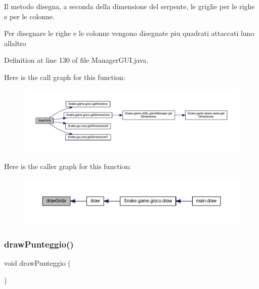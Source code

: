 Il metodo disegna, a seconda della dimensione del serpente, le griglie per le righe e per le colonne. 

Per disegnare le righe e le colonne vengono disegnate piu\textquotesingle{} quadrati attaccati l\textquotesingle{}uno all\textquotesingle{}altro 

Definition at line 130 of file Manager\+G\+U\+I.\+java.

Here is the call graph for this function\+:
\nopagebreak
\begin{figure}[H]
\begin{center}
\leavevmode
\includegraphics[width=350pt]{class_snake_1_1gui_1_1_manager_g_u_i_a61024a21b8516cb0751fcecaf18c001d_cgraph}
\end{center}
\end{figure}
Here is the caller graph for this function\+:
\nopagebreak
\begin{figure}[H]
\begin{center}
\leavevmode
\includegraphics[width=350pt]{class_snake_1_1gui_1_1_manager_g_u_i_a61024a21b8516cb0751fcecaf18c001d_icgraph}
\end{center}
\end{figure}
\mbox{\label{class_snake_1_1gui_1_1_manager_g_u_i_ab1a7af3f7073e8975696c4806e9194ef}} 
\subsubsection{\texorpdfstring{draw\+Punteggio()}{drawPunteggio()}}
{\footnotesize\ttfamily void draw\+Punteggio (\begin{DoxyParamCaption}{ }\end{DoxyParamCaption})\hspace{0.3cm}{\ttfamily [private]}}



